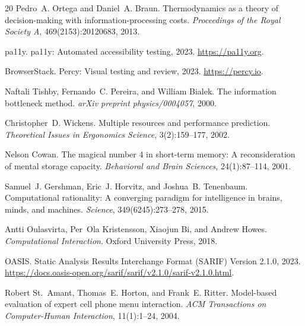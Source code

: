 \documentclass[11pt,twocolumn]{article}
\theoremstyle{definition}
\begin{document}
\begin{thebibliography}{20}
Pedro~A. Ortega and Daniel~A. Braun.
\newblock Thermodynamics as a theory of decision-making with information-processing costs.
\newblock \emph{Proceedings of the Royal Society A}, 469(2153):20120683, 2013.

pa11y.
\newblock pa11y: Automated accessibility testing, 2023.
\newblock \url{https://pa11y.org}.

BrowserStack.
\newblock Percy: Visual testing and review, 2023.
\newblock \url{https://percy.io}.

Naftali Tishby, Fernando~C. Pereira, and William Bialek.
\newblock The information bottleneck method.
\newblock \emph{arXiv preprint physics/0004057}, 2000.

Christopher~D. Wickens.
\newblock Multiple resources and performance prediction.
\newblock \emph{Theoretical Issues in Ergonomics Science}, 3(2):159--177, 2002.

Nelson Cowan.
\newblock The magical number 4 in short-term memory: A reconsideration of mental storage capacity.
\newblock \emph{Behavioral and Brain Sciences}, 24(1):87--114, 2001.

Samuel~J. Gershman, Eric~J. Horvitz, and Joshua~B. Tenenbaum.
\newblock Computational rationality: A converging paradigm for intelligence in brains, minds, and machines.
\newblock \emph{Science}, 349(6245):273--278, 2015.

Antti Oulasvirta, Per~Ola Kristensson, Xiaojun Bi, and Andrew Howes.
\newblock \emph{Computational Interaction}.
\newblock Oxford University Press, 2018.

{OASIS}.
\newblock Static Analysis Results Interchange Format ({SARIF}) Version 2.1.0, 2023.
\newblock \url{https://docs.oasis-open.org/sarif/sarif/v2.1.0/sarif-v2.1.0.html}.

Robert St.~Amant, Thomas~E. Horton, and Frank~E. Ritter.
\newblock Model-based evaluation of expert cell phone menu interaction.
\newblock \emph{ACM Transactions on Computer-Human Interaction}, 11(1):1--24, 2004.

\end{thebibliography}
\end{document}
